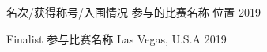 


\begin{cvhonors}

  \cvhonor
    {名次/获得称号/入围情况} %
    {参与的比赛名称} %
    {位置} %
    {2019} %

  \cvhonor
    {Finalist} %
    {参与比赛名称} %
    {Las Vegas, U.S.A} %
    {2019} %


\end{cvhonors}


